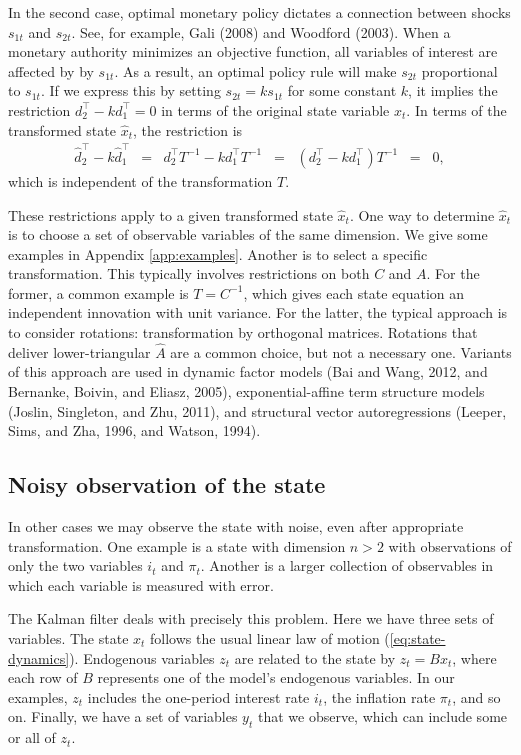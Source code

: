 \documentclass[11pt]{article}
\begin{document}
{In the second case, optimal monetary policy dictates a connection between
shocks $s_{1t}$ and $s_{2t}$.
See, for example, Gali (2008) and Woodford (2003).  %
When a monetary authority minimizes an objective function,
all variables of interest are affected by by $s_{1t}$.
As a result, an optimal policy rule will make $s_{2t}$ proportional to $s_{1t}$.
If we express this by setting $s_{2t} = k s_{1t}$ for some constant $k$,
it implies the restriction $ d_2^\top - k d_1^\top = 0$ in terms of the original
state variable $x_t$.
In terms of the transformed state $\hat{x}_t$, the restriction is
\begin{eqnarray*}
    \hat{d}_2^{\top} - k \hat{d}_1^{\top}
            &=& d_2^\top T^{-1}- k d_1^\top T^{-1}
            \;\;=\;\; (d_2^\top - k d_1^\top) T^{-1}
            \;\;=\;\; 0,
\end{eqnarray*}
which is independent of the transformation $T$.

These restrictions apply to a given transformed state $\hat{x}_t$.
One way to determine $\hat{x}_t$ is to choose a set of observable variables of the same dimension.
We give some examples in Appendix \ref{app:examples}.
Another is to select a specific transformation.
This typically involves restrictions on both $C$ and $A$.
For the former, a common example is $ T = C^{-1}$,
which gives each state equation an independent innovation with unit variance.
For the latter, the typical approach is to consider rotations:
transformation by orthogonal matrices.
Rotations that deliver lower-triangular $\widehat{A}$ are a common choice,
but not a necessary one.
Variants of this approach are used in
dynamic factor models (Bai and Wang, 2012, and Bernanke, Boivin, and Eliasz, 2005),
exponential-affine term structure models (Joslin, Singleton, and Zhu, 2011),
and structural vector autoregressions
(Leeper, Sims, and Zha, 1996, and Watson, 1994).


\subsection{Noisy observation of the state}

In other cases we may observe the state with noise,
even after appropriate transformation.
One example is a state with dimension $n>2$
with observations of only the two variables $i_t$ and $\pi_t$.
Another is a larger collection of observables
in which each variable is measured with error.

The Kalman filter deals with precisely this problem.
Here we have three sets of variables.
The state $x_t$ follows
the usual linear law of motion (\ref{eq:state-dynamics}).
Endogenous variables $z_t$ are related to the state by $ z_t = B x_t$,
where each row of $B$ represents one of the model's endogenous variables.
In our examples, $z_t$ includes the one-period interest rate $i_t$,
the inflation rate $\pi_t$, and so on.
Finally, we have a set of variables $y_t$ that we observe,
which can include some or all of $z_t$.

}
\end{document}
